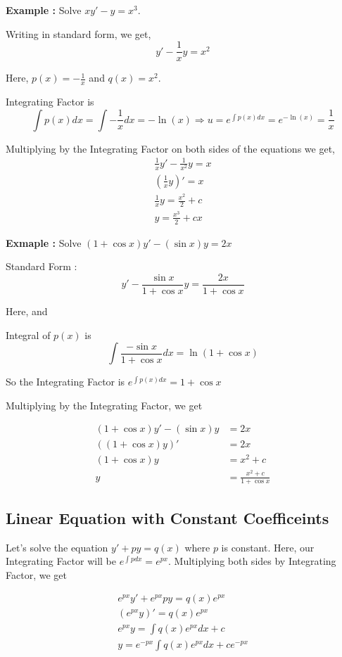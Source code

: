 {\bf Example : } Solve $xy' - y = x^3$.

Writing in standard form, we get,
$$ y' - \frac{1}{x} y = x^2 $$

Here, $p(x) = - \frac{1}{x}$ and $q(x) = x^2$.

Integrating Factor is
$$ \int p(x) dx = \int - \frac{1}{x} dx = - \ln(x) \Rightarrow u = e^{\int p(x) dx} = e^{-\ln(x)} = \frac{1}{x} $$

Multiplying by the Integrating Factor on both sides of the equations we get,
\begin{align*}
	\frac{1}{x}y' - \frac{1}{x^2}y = x \\
	\left( \frac{1}{x} y \right)' = x \\
	\frac{1}{x} y = \frac{x^2}{2} + c \\
	y = \frac{x^3}{2} + cx
\end{align*}


{\bf Exmaple : } Solve $ (1 + \cos x) y' - (\sin x) y = 2x $

Standard Form : $$ y' - \frac{\sin x}{1 + \cos x} y = \frac{2x}{1 + \cos x} $$

Here,  and 

Integral of $p(x)$ is $$ \int \frac{ - \sin x }{1 + \cos x} dx = \ln( 1 + \cos x ) $$

So the Integrating Factor is $ e^{\int p(x) dx} = 1 + \cos x $

Multiplying by the Integrating Factor, we get

\begin{align*}
	(1+ \cos x)y' - ( \sin x )y & = 2x \\
	((1 + \cos x) y)' & = 2x \\
	(1 + \cos x) y & = x^2 + c \\
	y & = \frac{x^2 + c}{1 + \cos x}
\end{align*}

\subsection{Linear Equation with Constant Coefficeints}

Let's solve the equation $ y' + py = q(x) $ where $p$ is constant.
Here, our Integrating Factor will be $ e^{\int p dx} = e^{px} $.
Multiplying both sides by Integrating Factor, we get

\begin{gather*}
e^{px}y' + e^{px} p y = q(x) e^{px} \\
(e^{px} y)' = q(x) e^{px} \\
e^{px} y = \int q(x) e^{px} dx + c \\
y = e^{-px} \int q(x) e^{px} dx + c e^{-px}
\end{gather*}

